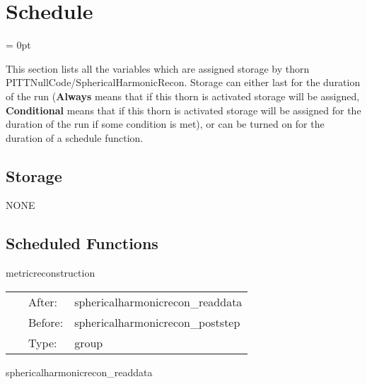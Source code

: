 
\section{Schedule} 


\parskip = 0pt


\noindent This section lists all the variables which are assigned storage by thorn PITTNullCode/SphericalHarmonicRecon.  Storage can either last for the duration of the run ({\bf Always} means that if this thorn is activated storage will be assigned, {\bf Conditional} means that if this thorn is activated storage will be assigned for the duration of the run if some condition is met), or can be turned on for the duration of a schedule function.


\subsection*{Storage}NONE
\subsection*{Scheduled Functions}
\vspace{5mm}


\hspace{5mm} metricreconstruction 

\hspace{5mm}{\it group for use by external thorns to use the metric } 


\hspace{5mm}

 \begin{tabular*}{160mm}{cll} 
~ & After:  & sphericalharmonicrecon\_readdata \\ 
~ & Before:  & sphericalharmonicrecon\_poststep \\ 
~ & Type:  & group \\ 
\end{tabular*} 


\vspace{5mm}


\hspace{5mm} sphericalharmonicrecon\_readdata 

\hspace{5mm}{\it read the world tube data and set the data flag to read } 


\hspace{5mm}

